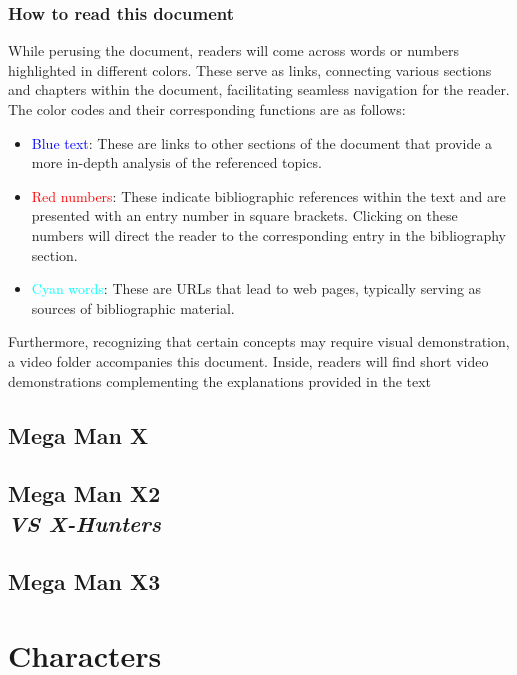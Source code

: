 \documentclass[openany]{report}
\begin{document}
	\section*{How to read this document}
	While perusing the document, readers will come across words or numbers highlighted in different colors. These serve as links, connecting various sections and chapters within the document, facilitating seamless navigation for the reader. The color codes and their corresponding functions are as follows:
	\begin{itemize}
		
	\item \textcolor{blue}{Blue text}: These are links to other sections of the document that provide a more in-depth analysis of the referenced topics.
	
	\item \textcolor{red}{Red numbers}: These indicate bibliographic references within the text and are presented with an entry number in square brackets. Clicking on these numbers will direct the reader to the corresponding entry in the bibliography section.
	
	\item \textcolor{cyan}{Cyan words}: These are URLs that lead to web pages, typically serving as sources of bibliographic material.
	\end{itemize}
	
	Furthermore, recognizing that certain concepts may require visual demonstration, a video folder accompanies this document. Inside, readers will find short video demonstrations complementing the explanations provided in the text
	
	
\chapter{Mega Man X}
\label{cha:X1}
%	

\chapter[Mega Man X2]{Mega Man X2\\[2ex]\Large\itshape{VS X-Hunters}}
\label{cha:X2}
	
	
\chapter{Mega Man X3}
	\label{cha:X3}
%	
\part{Characters}
\end{document}
